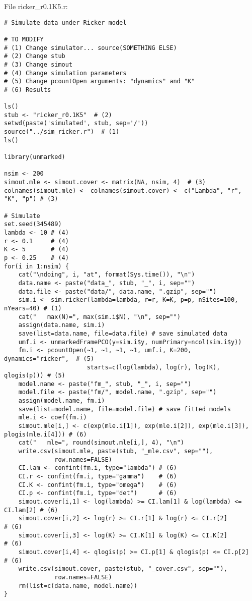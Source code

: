 \documentclass[12pt]{article}
\begin{document}
File ricker\_r0.1K5.r:
\begin{verbatim}
# Simulate data under Ricker model

# TO MODIFY
# (1) Change simulator... source(SOMETHING ELSE)
# (2) Change stub
# (3) Change simout
# (4) Change simulation parameters
# (5) Change pcountOpen arguments: "dynamics" and "K"
# (6) Results

ls()
stub <- "ricker_r0.1K5"  # (2)
setwd(paste('simulated', stub, sep='/'))
source("../sim_ricker.r")  # (1)
ls()

library(unmarked)

nsim <- 200
simout.mle <- simout.cover <- matrix(NA, nsim, 4)  # (3)
colnames(simout.mle) <- colnames(simout.cover) <- c("Lambda", "r", "K", "p") # (3)

# Simulate
set.seed(345489)
lambda <- 10 # (4)
r <- 0.1     # (4)
K <- 5       # (4)
p <- 0.25    # (4)
for(i in 1:nsim) {
    cat("\ndoing", i, "at", format(Sys.time()), "\n")
    data.name <- paste("data_", stub, "_", i, sep="")
    data.file <- paste("data/", data.name, ".gzip", sep="")
    sim.i <- sim.ricker(lambda=lambda, r=r, K=K, p=p, nSites=100, nYears=40) # (1)
    cat("   max(N)=", max(sim.i$N), "\n", sep="")
    assign(data.name, sim.i)
    save(list=data.name, file=data.file) # save simulated data
    umf.i <- unmarkedFramePCO(y=sim.i$y, numPrimary=ncol(sim.i$y))
    fm.i <- pcountOpen(~1, ~1, ~1, ~1, umf.i, K=200, dynamics="ricker",  # (5)
                       starts=c(log(lambda), log(r), log(K), qlogis(p))) # (5)
    model.name <- paste("fm_", stub, "_", i, sep="")
    model.file <- paste("fm/", model.name, ".gzip", sep="")
    assign(model.name, fm.i)
    save(list=model.name, file=model.file) # save fitted models
    mle.i <- coef(fm.i)
    simout.mle[i,] <- c(exp(mle.i[1]), exp(mle.i[2]), exp(mle.i[3]), plogis(mle.i[4])) # (6)
    cat("   mle=", round(simout.mle[i,], 4), "\n")
    write.csv(simout.mle, paste(stub, "_mle.csv", sep=""),
              row.names=FALSE)
    CI.lam <- confint(fm.i, type="lambda") # (6)
    CI.r <- confint(fm.i, type="gamma")    # (6)
    CI.K <- confint(fm.i, type="omega")    # (6)
    CI.p <- confint(fm.i, type="det")      # (6)
    simout.cover[i,1] <- log(lambda) >= CI.lam[1] & log(lambda) <= CI.lam[2] # (6)
    simout.cover[i,2] <- log(r) >= CI.r[1] & log(r) <= CI.r[2]               # (6)
    simout.cover[i,3] <- log(K) >= CI.K[1] & log(K) <= CI.K[2]               # (6)
    simout.cover[i,4] <- qlogis(p) >= CI.p[1] & qlogis(p) <= CI.p[2]         # (6)
    write.csv(simout.cover, paste(stub, "_cover.csv", sep=""),
              row.names=FALSE)
    rm(list=c(data.name, model.name))
}
\end{verbatim}
\end{document}
